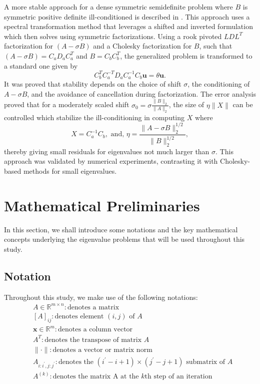 A more stable approach for a dense symmetric semidefinite problem where $B$ is symmetric positive definite  ill-conditioned is described in \cite{5b3d5fb1-4813-3046-9331-a730b392f611}. This approach uses a spectral transformation method that leverages  a shifted and inverted formulation  which  then solves  using symmetric factorizations. Using a rook pivoted $LDL^T$ factorization for $(A-\sigma B)$ and a Cholesky factorization for $B$, such that $(A-\sigma B) = C_aD_aC_a^T$ and $B = C_bC_b^T$, the generalized problem is transformed to a standard one given by 
\begin{equation}
	C_b^TC_a^{-T}D_aC_a^{-1}C_b \mathbf{u} = \theta \mathbf{u}.
\end{equation}
It was proved that stability depends on the choice of shift $\sigma$, the conditioning of $A - \sigma B$, and the avoidance of cancellation during factorization. The error analysis proved that for a moderately scaled shift $\sigma_0 = \sigma \frac{\|B\|_2}{\|A\|_2}$, the size of $\eta \|X\|$ can be controlled which stabilize the ill-conditioning in computing $X$ where 
\begin{equation}
	X = C_a^{-1}C_b, \text{ and, } \eta = \frac{\|A - \sigma B\|_2^{1/2}}{\|B\|_2^{1/2}},
\end{equation}
thereby giving small residuals for eigenvalues not much larger than $\sigma$. This approach was validated by numerical experiments, contrasting it with  Cholesky-based methods  for small eigenvalues.

\section{Mathematical Preliminaries}\label{sec:MathPrelim}

In this section, we shall introduce some notations and the key mathematical concepts underlying the eigenvalue problems that will be used throughout this study.

\subsection{Notation}

Throughout this study, we make use of the following notations:
\begin{align*}\nonumber
	&A \in \mathbb{R}^{m\times n}: \text{denotes a matrix}\\
	&[A]_{ij}: \text{denotes element $(i, j)$ of $A$}\\
	&\mathbf{x} \in \mathbb{R}^{m}: \text{denotes a column vector}\\
	&A^{T}: \text{denotes the transpose of matrix $A$}\\
	&\| \cdot \|: \text{denotes a vector or matrix norm }\\
	&A_{i:i^\prime, j:j^\prime}: \text{denotes the $(i^\prime - i + 1) \times (j^\prime - j + 1)$ submatrix of $A$}\\
	&A^{(k)}: \text{denotes the matrix A at the $k$th step of an iteration}
\end{align*}

